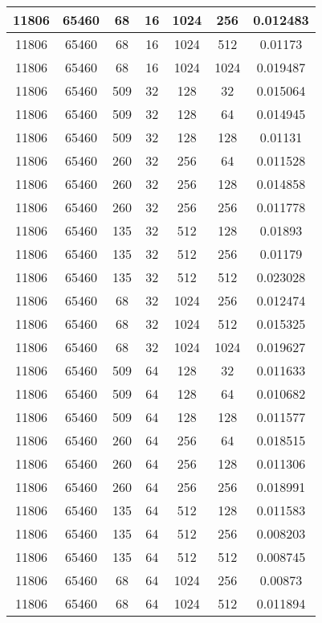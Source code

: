 \documentclass[9pt]{article}
\begin{document}
\begin{tabular}{|c|c|c|c|c|c|c| }
\hline
11806  & 65460  & 68  & 16  & 1024  & 256  & 0.012483 \\
\hline
11806  & 65460  & 68  & 16  & 1024  & 512  & 0.01173 \\
\hline
11806  & 65460  & 68  & 16  & 1024  & 1024  & 0.019487 \\
\hline
11806  & 65460  & 509  & 32  & 128  & 32  & 0.015064 \\
\hline
11806  & 65460  & 509  & 32  & 128  & 64  & 0.014945 \\
\hline
11806  & 65460  & 509  & 32  & 128  & 128  & 0.01131 \\
\hline
11806  & 65460  & 260  & 32  & 256  & 64  & 0.011528 \\
\hline
11806  & 65460  & 260  & 32  & 256  & 128  & 0.014858 \\
\hline
11806  & 65460  & 260  & 32  & 256  & 256  & 0.011778 \\
\hline
11806  & 65460  & 135  & 32  & 512  & 128  & 0.01893 \\
\hline
11806  & 65460  & 135  & 32  & 512  & 256  & 0.01179 \\
\hline
11806  & 65460  & 135  & 32  & 512  & 512  & 0.023028 \\
\hline
11806  & 65460  & 68  & 32  & 1024  & 256  & 0.012474 \\
\hline
11806  & 65460  & 68  & 32  & 1024  & 512  & 0.015325 \\
\hline
11806  & 65460  & 68  & 32  & 1024  & 1024  & 0.019627 \\
\hline
11806  & 65460  & 509  & 64  & 128  & 32  & 0.011633 \\
\hline
11806  & 65460  & 509  & 64  & 128  & 64  & 0.010682 \\
\hline
11806  & 65460  & 509  & 64  & 128  & 128  & 0.011577 \\
\hline
11806  & 65460  & 260  & 64  & 256  & 64  & 0.018515 \\
\hline
11806  & 65460  & 260  & 64  & 256  & 128  & 0.011306 \\
\hline
11806  & 65460  & 260  & 64  & 256  & 256  & 0.018991 \\
\hline
11806  & 65460  & 135  & 64  & 512  & 128  & 0.011583 \\
\hline
11806  & 65460  & 135  & 64  & 512  & 256  & 0.008203 \\
\hline
11806  & 65460  & 135  & 64  & 512  & 512  & 0.008745 \\
\hline
11806  & 65460  & 68  & 64  & 1024  & 256  & 0.00873 \\
\hline
11806  & 65460  & 68  & 64  & 1024  & 512  & 0.011894 \\

\end{tabular}
\end{document}

